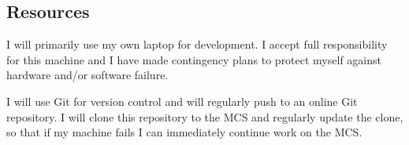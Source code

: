 \documentclass[12pt,a4paper]{article}
\begin{document}
\subsection*{Resources}

I will primarily use my own laptop for development. I accept full responsibility for this machine and I have made contingency plans to protect myself against hardware and/or software failure.

I will use Git for version control and will regularly push to an online Git repository. I will clone this repository to the MCS and regularly update the clone, so that if my machine fails I can immediately continue work on the MCS.
\end{document}
